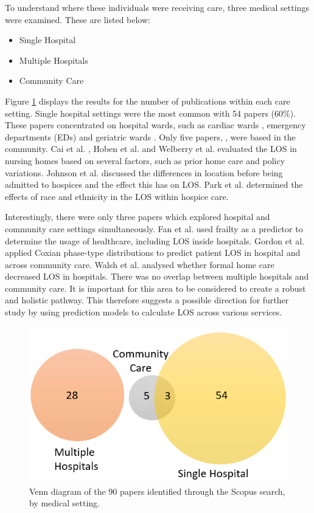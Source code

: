 \documentclass[../thesis.tex]{subfiles}
\begin{document}
To understand where these individuals were receiving care, three medical settings were examined. These are listed below:

\begin{itemize}
    \item Single Hospital
    \item Multiple Hospitals
    \item Community Care
\end{itemize}

Figure \ref{fig:litreview2-care} displays the results for the number of publications within each care setting. Single hospital settings were the most common with 54 papers (60\%). These papers concentrated on hospital wards, such as cardiac wards \cite{Cacciatore2012}, emergency departments (EDs) \cite{Bahrmann2018} and geriatric wards \cite{Tal2021}. Only five papers, \cite{Cai2009, Hoben2019, Johnson2011, Park2012, Welberry}, were based in the community. Cai et al. \cite{Cai2009}, Hoben et al. \cite{Hoben2019} and Welberry et al. \cite{Welberry} evaluated the LOS in nursing homes based on several factors, such as prior home care and policy variations. Johnson et al. \cite{Johnson2011} discussed the differences in location before being admitted to hospices and the effect this has on LOS. Park et al. \cite{Park2012} determined the effects of race and ethnicity in the LOS within hospice care.

Interestingly, there were only three papers which explored hospital and community care settings simultaneously. Fan et al. \cite{Fan2021} used frailty as a predictor to determine the usage of healthcare, including LOS inside hospitals. Gordon et al. \cite{Gordon2} applied Coxian phase-type distributions to predict patient LOS in hospital and across community care. Walsh et al. \cite{Walsh2020} analysed whether formal home care decreased LOS in hospitals. There was no overlap between multiple hospitals and community care. It is important for this area to be considered to create a robust and holistic pathway. This therefore suggests a possible direction for further study by using prediction models to calculate LOS across various services.

\begin{figure}[h!]
    \centering
    \includegraphics[scale=1]{Chapters/Chapter2/Figures3/2lrvenn.png}
    \caption{Venn diagram of the 90 papers identified through the Scopus search, by medical setting.}
    \label{fig:litreview2-care}
\end{figure}
\end{document}
